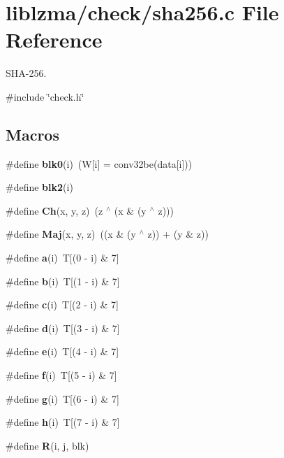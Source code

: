 \section{liblzma/check/sha256.c File Reference}
\label{sha256_8c}


S\+H\+A-\/256.  


{\ttfamily \#include \char`\"{}check.\+h\char`\"{}}\newline
\subsection*{Macros}
\begin{DoxyCompactItemize}
\item 
\mbox{\label{sha256_8c_a1a75de24d0277c5319098c218efaef2d}} 
\#define {\bfseries blk0}(i)~(W[i] = conv32be(data[i]))
\item 
\#define {\bfseries blk2}(i)
\item 
\mbox{\label{sha256_8c_ab0a0d1ad13c7e4d3cb38c89f7127c85a}} 
\#define {\bfseries Ch}(x,  y,  z)~(z $^\wedge$ (x \& (y $^\wedge$ z)))
\item 
\mbox{\label{sha256_8c_a447cd1d7fb703b62666400976be24bf3}} 
\#define {\bfseries Maj}(x,  y,  z)~((x \& (y $^\wedge$ z)) + (y \& z))
\item 
\mbox{\label{sha256_8c_aa9b8e98b3989bdffd7f36b281c72a693}} 
\#define {\bfseries a}(i)~T[(0 -\/ i) \& 7]
\item 
\mbox{\label{sha256_8c_a337ad8a7e52da2d584c2018f2ec2c81e}} 
\#define {\bfseries b}(i)~T[(1 -\/ i) \& 7]
\item 
\mbox{\label{sha256_8c_a63f410abde93141c9013b7d3f3971738}} 
\#define {\bfseries c}(i)~T[(2 -\/ i) \& 7]
\item 
\mbox{\label{sha256_8c_a23b5b0a85bf5762c93a855f40c0343ce}} 
\#define {\bfseries d}(i)~T[(3 -\/ i) \& 7]
\item 
\mbox{\label{sha256_8c_af62772e2f383ddbe93a93eff2a5f543a}} 
\#define {\bfseries e}(i)~T[(4 -\/ i) \& 7]
\item 
\mbox{\label{sha256_8c_a357394e0f6f88c8a57bd893ab28dc8f8}} 
\#define {\bfseries f}(i)~T[(5 -\/ i) \& 7]
\item 
\mbox{\label{sha256_8c_a9608045402267746965fa49d90bbada4}} 
\#define {\bfseries g}(i)~T[(6 -\/ i) \& 7]
\item 
\mbox{\label{sha256_8c_acf9942d15f0dd0ac4fc5ca66096a3f6d}} 
\#define {\bfseries h}(i)~T[(7 -\/ i) \& 7]
\item 
\#define {\bfseries R}(i,  j,  blk)

\end{DoxyCompactItemize}
